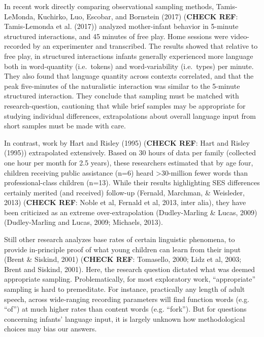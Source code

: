 \documentclass[floatsintext,man]{apa6}
\theoremstyle{definition}
\theoremstyle{definition}
\theoremstyle{definition}
\theoremstyle{remark}
\begin{document}
In recent work directly comparing observational sampling methods,
Tamis-LeMonda, Kuchirko, Luo, Escobar, and Bornstein (2017)
(\textbf{CHECK REF}: Tamis-Lemonda et al. (2017)) analyzed mother-infant
behavior in 5-minute structured interactions, and 45 minutes of free
play. Home sessions were video-recorded by an experimenter and
transcribed. The results showed that relative to free play, in
structured interactions infants generally experienced more language both
in word-quantity (i.e.~tokens) and word-variability (i.e.~types) per
minute. They also found that language quantity across contexts
correlated, and that the peak five-minutes of the naturalistic
interaction was similar to the 5-minute structured interaction. They
conclude that sampling must be matched with research-question,
cautioning that while brief samples may be appropriate for studying
individual differences, extrapolations about overall language input from
short samples must be made with care.

In contrast, work by Hart and Risley (1995) (\textbf{CHECK REF}: Hart
and Risley (1995)) extrapolated extensively. Based on 30 hours of data
per family (collected one hour per month for 2.5 years), these
researchers estimated that by age four, children receiving public
assistance (n=6) heard \textgreater{}30-million fewer words than
professional-class children (n=13). While their results highlighting SES
differences certainly merited (and received) follow-up (Fernald,
Marchman, \& Weisleder, 2013) (\textbf{CHECK REF}: Noble et al, Fernald
et al, 2013, inter alia), they have been criticized as an extreme
over-extrapolation (Dudley-Marling \& Lucas, 2009) (Dudley-Marling and
Lucas, 2009; Michaels, 2013).

Still other research analyzes base rates of certain linguistic
phenomena, to provide in-principle proof of what young children can
learn from their input (Brent \& Siskind, 2001) (\textbf{CHECK REF}:
Tomasello, 2000; Lidz et al, 2003; Brent and Siskind, 2001). Here, the
research question dictated what was deemed appropriate sampling.
Problematically, for most exploratory work, \enquote{appropriate}
sampling is hard to premeditate. For instance, practically any length of
adult speech, across wide-ranging recording parameters will find
function words (e.g. \enquote{of}) at much higher rates than content
words (e.g. \enquote{fork}). But for questions concerning infants'
language input, it is largely unknown how methodological choices may
bias our answers.
\end{document}
